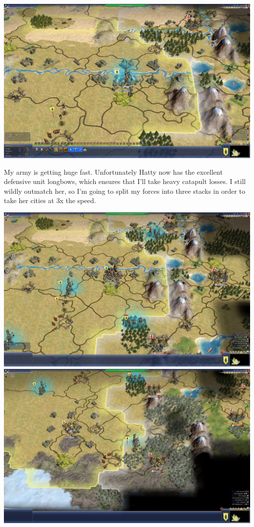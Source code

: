 \documentclass[10pt]{article}
\begin{document}
\includegraphics[width=1.0\textwidth]{128}

My army is getting huge fast. Unfortunately Hatty now has the excellent defensive unit longbows, which ensures
that I'll take heavy catapult losses. I still wildly outmatch her, so I'm going to split my forces into three
stacks in order to take her cities at 3x the speed.

\includegraphics[width=1.0\textwidth]{129}
\includegraphics[width=1.0\textwidth]{130}
\end{document}
